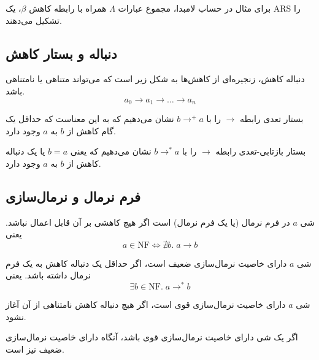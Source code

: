 برای مثال در حساب لامبدا، مجموع عبارات
$\Lambda$
همراه با رابطه کاهش
$\beta$،
یک
ARS
را تشکیل می‌دهند.

\subsection*{دنباله و بستار کاهش}

\begin{defn}
دنباله کاهش، زنجیره‌ای از کاهش‌ها به شکل زیر است که می‌تواند متناهی یا نامتناهی باشد.
\begin{equation*}
a_0 \rightarrow a_1 \rightarrow \dots \rightarrow a_n   
\end{equation*}
\end{defn}

\begin{defn}
بستار تعدی رابطه
$\rightarrow$
را با
$b \rightarrow^+ a$
نشان می‌دهیم که به این معناست که حداقل یک گام کاهش از
$b$
به
$a$
وجود دارد.

بستار بازتابی-تعدی رابطه
$\rightarrow$
را با
$b \rightarrow^* a$
نشان می‌دهیم که یعنی
$b = a$
یا
یک دنباله کاهش از
$b$
به
$a$
وجود دارد.
\end{defn}

\subsection*{فرم نرمال و نرمال‌سازی}

\begin{defn}
شی
$a$
در فرم نرمال (یا یک فرم نرمال) است اگر هیچ کاهشی بر آن قابل اعمال نباشد. یعنی
\begin{equation*}
a \in \mathrm{NF} \iff \nexists b.\;a \rightarrow b
\end{equation*}
\end{defn}

\begin{defn}
شی
$a$
دارای خاصیت نرمال‌سازی ضعیف است، اگر حداقل یک دنباله کاهش به یک فرم نرمال داشته باشد. یعنی
\begin{equation*}
\exists b \in \mathrm{NF}.\;a \rightarrow^* b   
\end{equation*}
\end{defn}

\begin{defn}
شی
$a$
دارای خاصیت نرمال‌سازی قوی است، اگر هیچ دنباله کاهش نامتناهی از آن آغاز نشود.
\end{defn}

\begin{thm}
اگر یک شی دارای خاصیت نرمال‌سازی قوی باشد، آنگاه دارای خاصیت نرمال‌سازی ضعیف نیز است.
\end{thm}

